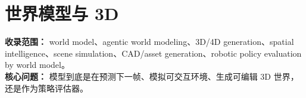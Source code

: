 
\section*{世界模型与 3D}
{}

\begin{conceptbox}
\textbf{收录范围：} world model、agentic world modeling、3D/4D generation、spatial intelligence、scene simulation、CAD/asset generation、robotic policy evaluation by world model。\\
\textbf{核心问题：} 模型到底是在预测下一帧、模拟可交互环境、生成可编辑 3D 世界，还是作为策略评估器。
\end{conceptbox}

